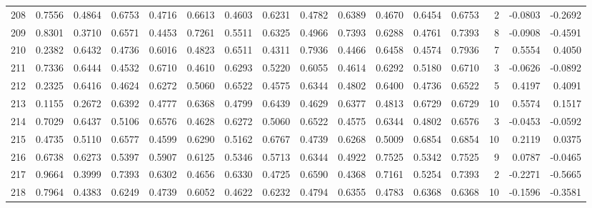 \begin{tabular}{lrrrrrrrrrrrrrrr}
208 &      0.7556 &  0.4864 &  0.6753 &  0.4716 &  0.6613 &  0.4603 &  0.6231 &  0.4782 &  0.6389 &  0.4670 &   0.6454 &     0.6753 &      2 &                   -0.0803 &                    -0.2692 \\
209 &      0.8301 &  0.3710 &  0.6571 &  0.4453 &  0.7261 &  0.5511 &  0.6325 &  0.4966 &  0.7393 &  0.6288 &   0.4761 &     0.7393 &      8 &                   -0.0908 &                    -0.4591 \\
210 &      0.2382 &  0.6432 &  0.4736 &  0.6016 &  0.4823 &  0.6511 &  0.4311 &  0.7936 &  0.4466 &  0.6458 &   0.4574 &     0.7936 &      7 &                    0.5554 &                     0.4050 \\
211 &      0.7336 &  0.6444 &  0.4532 &  0.6710 &  0.4610 &  0.6293 &  0.5220 &  0.6055 &  0.4614 &  0.6292 &   0.5180 &     0.6710 &      3 &                   -0.0626 &                    -0.0892 \\
212 &      0.2325 &  0.6416 &  0.4624 &  0.6272 &  0.5060 &  0.6522 &  0.4575 &  0.6344 &  0.4802 &  0.6400 &   0.4736 &     0.6522 &      5 &                    0.4197 &                     0.4091 \\
213 &      0.1155 &  0.2672 &  0.6392 &  0.4777 &  0.6368 &  0.4799 &  0.6439 &  0.4629 &  0.6377 &  0.4813 &   0.6729 &     0.6729 &     10 &                    0.5574 &                     0.1517 \\
214 &      0.7029 &  0.6437 &  0.5106 &  0.6576 &  0.4628 &  0.6272 &  0.5060 &  0.6522 &  0.4575 &  0.6344 &   0.4802 &     0.6576 &      3 &                   -0.0453 &                    -0.0592 \\
215 &      0.4735 &  0.5110 &  0.6577 &  0.4599 &  0.6290 &  0.5162 &  0.6767 &  0.4739 &  0.6268 &  0.5009 &   0.6854 &     0.6854 &     10 &                    0.2119 &                     0.0375 \\
216 &      0.6738 &  0.6273 &  0.5397 &  0.5907 &  0.6125 &  0.5346 &  0.5713 &  0.6344 &  0.4922 &  0.7525 &   0.5342 &     0.7525 &      9 &                    0.0787 &                    -0.0465 \\
217 &      0.9664 &  0.3999 &  0.7393 &  0.6302 &  0.4656 &  0.6330 &  0.4725 &  0.6590 &  0.4368 &  0.7161 &   0.5254 &     0.7393 &      2 &                   -0.2271 &                    -0.5665 \\
218 &      0.7964 &  0.4383 &  0.6249 &  0.4739 &  0.6052 &  0.4622 &  0.6232 &  0.4794 &  0.6355 &  0.4783 &   0.6368 &     0.6368 &     10 &                   -0.1596 &                    -0.3581 \\

\end{tabular}
